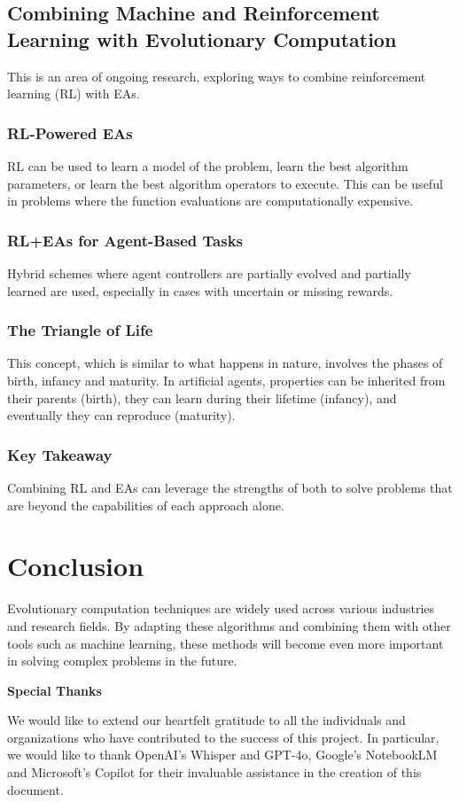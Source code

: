 \subsection*{Combining Machine and Reinforcement Learning with Evolutionary Computation}
This is an area of ongoing research, exploring ways to combine reinforcement learning (RL) with EAs.
\subsubsection*{RL-Powered EAs}
RL can be used to learn a model of the problem, learn the best algorithm parameters, or learn the best algorithm operators to execute. This can be useful in problems where the function evaluations are computationally expensive.
\subsubsection*{RL+EAs for Agent-Based Tasks}
Hybrid schemes where agent controllers are partially evolved and partially learned are used, especially in cases with uncertain or missing rewards.
\subsubsection*{The Triangle of Life}
This concept, which is similar to what happens in nature, involves the phases of birth, infancy and maturity. In artificial agents, properties can be inherited from their parents (birth), they can learn during their lifetime (infancy), and eventually they can reproduce (maturity).
\subsubsection*{Key Takeaway}
Combining RL and EAs can leverage the strengths of both to solve problems that are beyond the capabilities of each approach alone.

\section{Conclusion}
Evolutionary computation techniques are widely used across various industries and research fields. By adapting these algorithms and combining them with other tools such as machine learning, these methods will become even more important in solving complex problems in the future.

\newpage

\thispagestyle{empty}
\vspace*{\fill}
\begin{center}
    \textbf{\Huge Special Thanks}
    \vspace{1cm}
    
    \Large
    We would like to extend our heartfelt gratitude to all the individuals and organizations who have contributed to the success of this project. In particular, we would like to thank OpenAI's Whisper and GPT-4o, Google's NotebookLM and Microsoft's Copilot for their invaluable assistance in the creation of this document.
\end{center}
\vspace*{\fill}
\newpage


